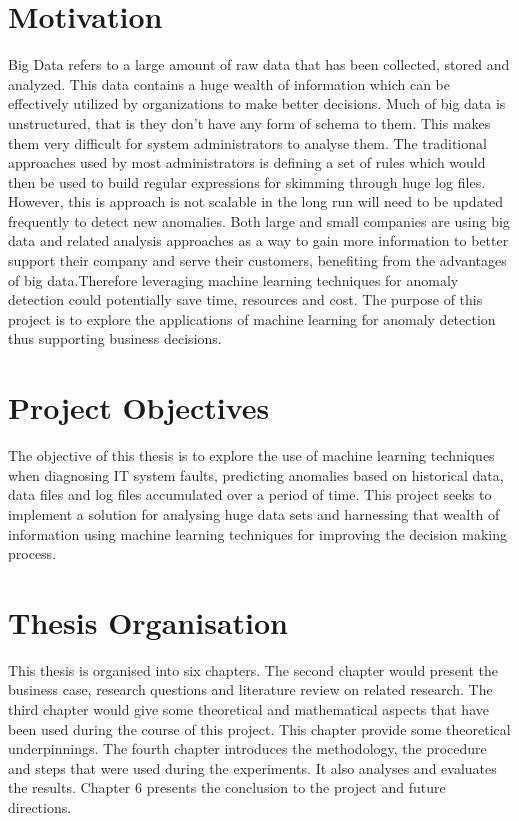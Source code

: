 \documentclass[12pt, letterpaper, titlepage]{report}
\begin{document}
\section{Motivation}
Big Data refers to a large amount of raw data that has been collected, stored and analyzed. This data contains a huge wealth of information which can be effectively utilized by organizations to make better decisions. Much of big data is unstructured, that is they don't have any form of schema to them. This makes them very difficult for system
administrators to analyse them. The traditional approaches used by most administrators is defining a set of rules which would then be used to build regular expressions for skimming through huge log files. However, this is approach is not scalable in the long run will need to be updated frequently to detect new anomalies. Both large and small companies are using big data and related analysis approaches as a way to gain more information to better support their company and serve their customers, benefiting from the advantages of big data.Therefore leveraging machine learning techniques for anomaly detection could potentially save time, resources and cost. The purpose of this project is to explore the applications of machine learning for anomaly detection thus supporting business decisions.
\section{Project Objectives}
The objective of this thesis is to explore the use of machine learning techniques when diagnosing IT system faults, predicting anomalies based on historical data, data files and log files accumulated over a period of time. This project seeks to implement a solution for analysing huge data sets and harnessing that wealth of information using machine learning techniques for improving the decision making process.
\section{Thesis Organisation}
This thesis is organised into six chapters. The second chapter would present the business case, research questions and literature review on related research. The third chapter would give some theoretical and mathematical aspects that have been used during the course of this project. This chapter provide some theoretical underpinnings. The fourth chapter introduces the methodology, the procedure and steps that were used during the experiments. It also analyses and evaluates the results. Chapter 6 presents the conclusion to the project and future directions.
\end{document}
